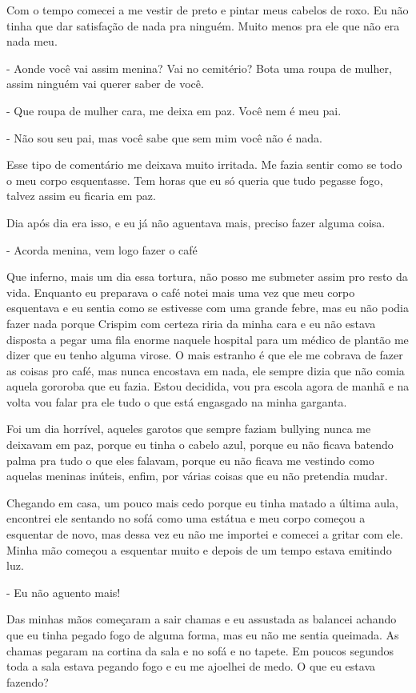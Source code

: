Com o tempo comecei a me vestir de preto e pintar meus cabelos de roxo. Eu não tinha que dar satisfação de nada pra ninguém. Muito menos pra ele que não era nada meu.

- Aonde você vai assim menina? Vai no cemitério? Bota uma roupa de mulher, assim ninguém vai querer saber de você.

- Que roupa de mulher cara, me deixa em paz. Você nem é meu pai.

- Não sou seu pai, mas você sabe que sem mim você não é nada.

Esse tipo de comentário me deixava muito irritada. Me fazia sentir como se todo o meu corpo esquentasse. Tem horas que eu só queria que tudo pegasse fogo, talvez assim eu ficaria em paz.

Dia após dia era isso, e eu já não aguentava mais, preciso fazer alguma coisa.

- Acorda menina, vem logo fazer o café

Que inferno, mais um dia essa tortura, não posso me submeter assim pro resto da vida. Enquanto eu preparava o café notei mais uma vez que meu corpo esquentava e eu sentia como se estivesse com uma grande febre, mas eu não podia fazer nada porque Crispim com certeza riria da minha cara e eu não estava disposta a pegar uma fila enorme naquele hospital para um médico de plantão me dizer que eu tenho alguma virose. O mais estranho é que ele me cobrava de fazer as coisas pro café, mas nunca encostava em nada, ele sempre dizia que não comia aquela gororoba que eu fazia. Estou decidida, vou pra escola agora de manhã e na volta vou falar pra ele tudo o que está engasgado na minha garganta.

Foi um dia horrível, aqueles garotos que sempre faziam bullying nunca me deixavam em paz, porque eu tinha o cabelo azul, porque eu não ficava batendo palma pra tudo o que eles falavam, porque eu não ficava me vestindo como aquelas meninas inúteis, enfim, por várias coisas que eu não pretendia mudar.

Chegando em casa, um pouco mais cedo porque eu tinha matado a última aula, encontrei ele sentando no sofá como uma estátua e meu corpo começou a esquentar de novo, mas dessa vez eu não me importei e comecei a gritar com ele. Minha mão começou a esquentar muito e depois de um tempo estava emitindo luz.

- Eu não aguento mais!

Das minhas mãos começaram a sair chamas e eu assustada as balancei achando que eu tinha pegado fogo de alguma forma, mas eu não me sentia queimada. As chamas pegaram na cortina da sala e no sofá e no tapete. Em poucos segundos toda a sala estava pegando fogo e eu me ajoelhei de medo. O que eu estava fazendo?

